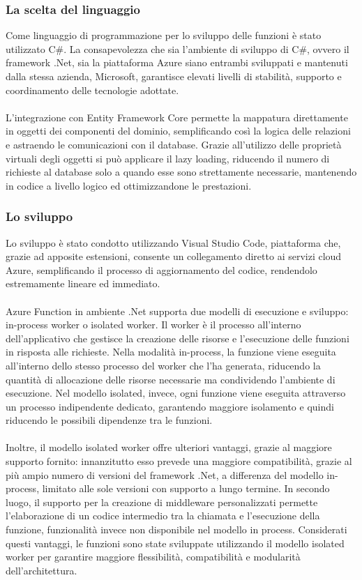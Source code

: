 \subsubsection{La scelta del linguaggio}
Come linguaggio di programmazione per lo sviluppo delle funzioni è stato utilizzato C\#.
La consapevolezza che sia l’ambiente di sviluppo di C\#, ovvero il framework .Net, sia la piattaforma Azure siano entrambi sviluppati e mantenuti dalla stessa azienda, Microsoft,
garantisce elevati livelli di stabilità, supporto e coordinamento delle tecnologie adottate.\\
\\
L’integrazione con Entity Framework Core permette la mappatura direttamente in oggetti dei componenti del dominio, 
semplificando così la logica delle relazioni e astraendo le comunicazioni con il database.
Grazie all’utilizzo delle proprietà virtuali degli oggetti si può applicare il lazy loading, 
riducendo il numero di richieste al database solo a quando esse sono strettamente necessarie, mantenendo in codice a livello logico ed ottimizzandone le prestazioni.
\subsubsection{Lo sviluppo}
Lo sviluppo è stato condotto utilizzando Visual Studio Code, piattaforma che, grazie ad apposite estensioni,
consente un collegamento diretto ai servizi cloud Azure, semplificando il processo di aggiornamento del codice, rendendolo estremamente lineare ed immediato.\\
\\
Azure Function in ambiente .Net supporta due modelli di esecuzione e sviluppo: in-process worker o isolated worker.
Il worker è il processo all’interno dell’applicativo che gestisce la creazione delle risorse e l’esecuzione delle funzioni in risposta alle richieste.
Nella modalità in-process, la funzione viene eseguita all’interno dello stesso processo del worker che l’ha generata,
riducendo la quantità di allocazione delle risorse necessarie ma condividendo l’ambiente di esecuzione.
Nel modello isolated, invece, ogni funzione viene eseguita attraverso un processo indipendente dedicato,
garantendo maggiore isolamento e quindi riducendo le possibili dipendenze tra le funzioni. \\
\\
Inoltre, il modello isolated worker offre ulteriori vantaggi, grazie al maggiore supporto fornito:
innanzitutto esso prevede una maggiore compatibilità, grazie al più ampio numero di versioni del framework .Net,
a differenza del modello in-process, limitato alle sole versioni con supporto a lungo termine.
In secondo luogo, il supporto per la creazione di middleware personalizzati 
permette l’elaborazione di un codice intermedio tra la chiamata e l’esecuzione della funzione,
funzionalità invece non disponibile nel modello in process.
Considerati questi vantaggi, le funzioni sono state sviluppate utilizzando il modello isolated worker 
per garantire maggiore flessibilità, compatibilità e modularità dell’architettura.
\clearpage





